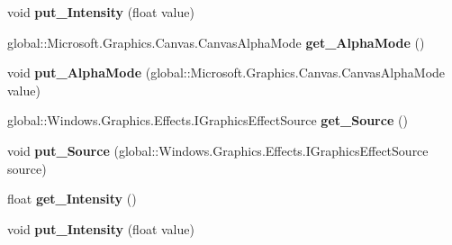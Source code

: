\begin{DoxyCompactItemize}
\mbox{\label{interface_microsoft_1_1_graphics_1_1_canvas_1_1_effects_1_1_i_sepia_effect_a9682e9765a9acc23c0ba196c33ca8367}} 
void {\bfseries put\+\_\+\+Intensity} (float value)
\item 
\mbox{\label{interface_microsoft_1_1_graphics_1_1_canvas_1_1_effects_1_1_i_sepia_effect_af0e3b772c6a8f51c2b8bc71a3c7e2e09}} 
global\+::\+Microsoft.\+Graphics.\+Canvas.\+Canvas\+Alpha\+Mode {\bfseries get\+\_\+\+Alpha\+Mode} ()
\item 
\mbox{\label{interface_microsoft_1_1_graphics_1_1_canvas_1_1_effects_1_1_i_sepia_effect_a28750df56d32d0e2653893f6de5805d7}} 
void {\bfseries put\+\_\+\+Alpha\+Mode} (global\+::\+Microsoft.\+Graphics.\+Canvas.\+Canvas\+Alpha\+Mode value)
\item 
\mbox{\label{interface_microsoft_1_1_graphics_1_1_canvas_1_1_effects_1_1_i_sepia_effect_ac7c0465ec6fc4284a0f0205b572f78a8}} 
global\+::\+Windows.\+Graphics.\+Effects.\+I\+Graphics\+Effect\+Source {\bfseries get\+\_\+\+Source} ()
\item 
\mbox{\label{interface_microsoft_1_1_graphics_1_1_canvas_1_1_effects_1_1_i_sepia_effect_a1673f79e0f93155b9778ad30b74eb86b}} 
void {\bfseries put\+\_\+\+Source} (global\+::\+Windows.\+Graphics.\+Effects.\+I\+Graphics\+Effect\+Source source)
\item 
\mbox{\label{interface_microsoft_1_1_graphics_1_1_canvas_1_1_effects_1_1_i_sepia_effect_aee3d7d45c759c48558e8ac58694d0f0f}} 
float {\bfseries get\+\_\+\+Intensity} ()
\item 
\mbox{\label{interface_microsoft_1_1_graphics_1_1_canvas_1_1_effects_1_1_i_sepia_effect_a9682e9765a9acc23c0ba196c33ca8367}} 
void {\bfseries put\+\_\+\+Intensity} (float value)
\item 

\end{DoxyCompactItemize}

